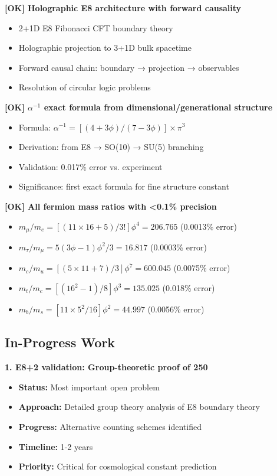 \documentclass[11pt]{article}
\theoremstyle{definition}
\newcommand{\goldenratio}{\phi}
\begin{document}
\textbf{[OK] Holographic E8 architecture with forward causality}
\begin{itemize}
\item 2+1D E8 Fibonacci CFT boundary theory
\item Holographic projection to 3+1D bulk spacetime
\item Forward causal chain: boundary → projection → observables
\item Resolution of circular logic problems
\end{itemize}

\textbf{[OK] $\alpha^{-1}$ exact formula from dimensional/generational structure}
\begin{itemize}
\item Formula: $\alpha^{-1} = [(4+3\goldenratio)/(7-3\goldenratio)]\times\pi^3$
\item Derivation: from E8 → SO(10) → SU(5) branching
\item Validation: 0.017\% error vs. experiment
\item Significance: first exact formula for fine structure constant
\end{itemize}

\textbf{[OK] All fermion mass ratios with <0.1\% precision}
\begin{itemize}
\item $m_\mu/m_e = [(11\times16+5)/3!]\goldenratio^4 = 206.765$ (0.0013\% error)
\item $m_\tau/m_\mu = 5(3\goldenratio-1)\goldenratio^2/3 = 16.817$ (0.0003\% error)
\item $m_c/m_u = [(5\times11+7)/3]\goldenratio^7 = 600.045$ (0.0075\% error)
\item $m_t/m_c = [(16^2-1)/8]\goldenratio^3 = 135.025$ (0.018\% error)
\item $m_b/m_s = [11\times5^2/16]\goldenratio^2 = 44.997$ (0.0056\% error)
\end{itemize}

\subsection{In-Progress Work}

\textbf{1. E8+2 validation: Group-theoretic proof of 250}
\begin{itemize}
\item \textbf{Status:} Most important open problem
\item \textbf{Approach:} Detailed group theory analysis of E8 boundary theory
\item \textbf{Progress:} Alternative counting schemes identified
\item \textbf{Timeline:} 1-2 years
\item \textbf{Priority:} Critical for cosmological constant prediction
\end{itemize}
\end{document}
